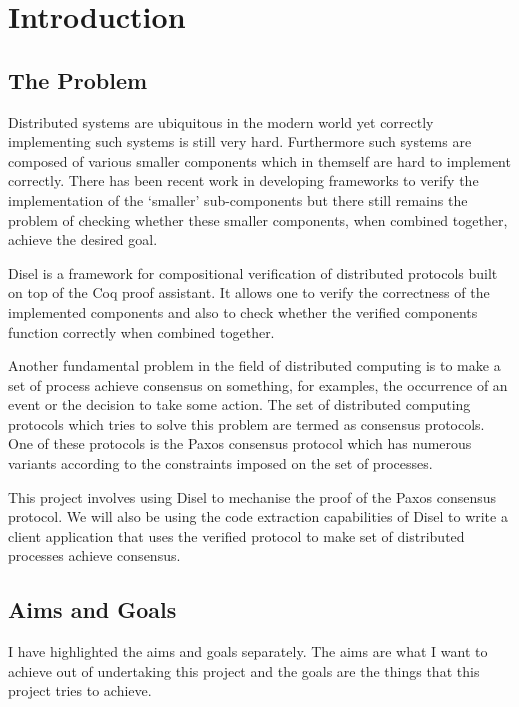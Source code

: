 \chapter{Introduction}

\section{The Problem}
Distributed systems are ubiquitous in the modern world yet
correctly implementing such systems is still very hard. Furthermore such
systems are composed of various smaller components which in themself are
hard to implement correctly. There has been recent work in developing
frameworks to verify the implementation of the `smaller' sub-components
but there still remains the problem of checking whether these smaller
components, when combined together, achieve the desired goal.

Disel is a framework for compositional verification of distributed
protocols built on top of the Coq proof assistant. It allows one to verify
the correctness of the implemented components and also to check whether
the verified components function correctly when combined together.

Another fundamental problem in the field of distributed computing is to make
a set of process achieve consensus on something, for examples, the occurrence
of an event or the decision to take some action. The set of distributed
computing protocols which tries to solve this problem are termed as
consensus protocols. One of these protocols is the Paxos consensus protocol
which has numerous variants according to the constraints imposed on the
set of processes.

This project involves using Disel to mechanise the proof of the Paxos consensus protocol.
We will also be using the code extraction capabilities of Disel to
write a client application that uses the verified protocol to make set of
distributed processes achieve consensus.

\section{Aims and Goals}
I have highlighted the aims and goals separately. The aims are what I want to
achieve out of undertaking this project and the goals are the things that this
project tries to achieve.

